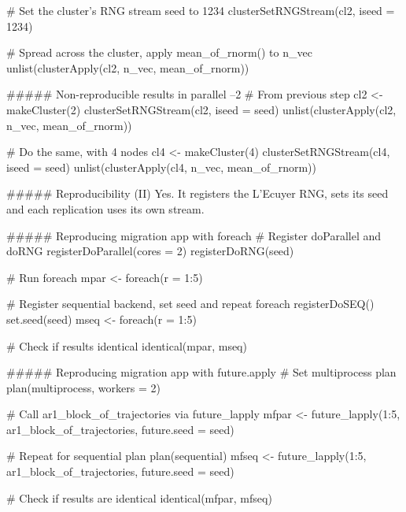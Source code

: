 # Set the cluster's RNG stream seed to 1234
clusterSetRNGStream(cl2, iseed = 1234)

# Spread across the cluster, apply mean_of_rnorm() to n_vec
unlist(clusterApply(cl2, n_vec, mean_of_rnorm))




##### Non-reproducible results in parallel --2
# From previous step
cl2 <- makeCluster(2)
clusterSetRNGStream(cl2, iseed = seed)
unlist(clusterApply(cl2, n_vec, mean_of_rnorm))

# Do the same, with 4 nodes
cl4 <- makeCluster(4)
clusterSetRNGStream(cl4, iseed = seed)
unlist(clusterApply(cl4, n_vec, mean_of_rnorm))



##### Reproducibility (II) 
Yes. It registers the L'Ecuyer RNG, sets its seed and each replication uses its own stream.


##### Reproducing migration app with foreach
# Register doParallel and doRNG
registerDoParallel(cores = 2)
registerDoRNG(seed)

# Run foreach
mpar <- foreach(r = 1:5) %

# Register sequential backend, set seed and repeat foreach
registerDoSEQ()
set.seed(seed)
mseq <- foreach(r = 1:5) %

# Check if results identical
identical(mpar, mseq)





##### Reproducing migration app with future.apply
# Set multiprocess plan 
plan(multiprocess, workers = 2)

# Call ar1_block_of_trajectories via future_lapply
mfpar <- future_lapply(1:5, ar1_block_of_trajectories, future.seed = seed)

# Repeat for sequential plan
plan(sequential)
mfseq <- future_lapply(1:5, ar1_block_of_trajectories, future.seed = seed)

# Check if results are identical
identical(mfpar, mfseq)


